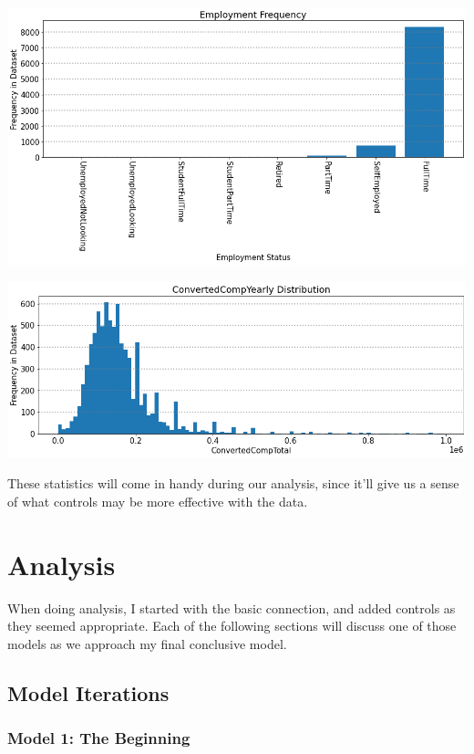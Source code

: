 \documentclass{report}
\begin{document}
\vspace{0.5in}

\includegraphics[width=0.9\linewidth]{frequencyEmployment.png}

\vspace{0.5in}

\includegraphics[width=0.9\linewidth]{frequencyConvertedCompYearly.png}

\vspace{0.5in}

These statistics will come in handy during our analysis, since it'll give us a sense of what controls may be more effective with the data.

\chapter{Analysis}

When doing analysis, I started with the basic connection, and added controls as they seemed appropriate. Each of the following sections will discuss one of those models as we approach my final conclusive model.

\section{Model Iterations}

\subsection{Model 1: The Beginning}
\end{document}
